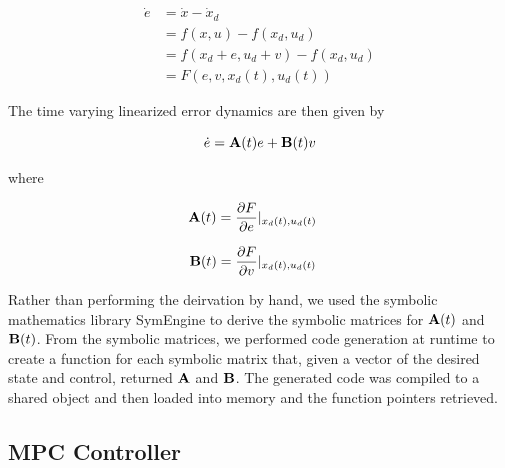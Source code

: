 \documentclass[conference]{IEEEtran}
\begin{document}
\begin{equation}
    \label{eq:nonlinear-error-dynamics}
    \begin{split}
        \dot{e} & = \dot{x} - \dot{x}_d \\
                & = f(x, u) - f(x_d, u_d) \\
                & = f(x_d + e, u_d + v) - f(x_d, u_d) \\
                & = F(e, v, x_d(t), u_d(t))
    \end{split}
\end{equation}

The time varying linearized error dynamics are then given by

\begin{equation}
    \label{eq:nonlinear-error-dynamics-lvi}
    \dot{e} = {\bf A}(t)e + {\bf B}(t)v
\end{equation}

where

\begin{equation}
    \label{eq:ltvA}
    \begin{aligned}
        {\bf A}(t) &= \frac{\partial F}{\partial e}|_{x_d(t),u_d(t)}
    \end{aligned}
\end{equation}

\begin{equation}
    \label{eq:ltvB}
    \begin{aligned}
        {\bf B}(t) &= \frac{\partial F}{\partial v}|_{x_d(t),u_d(t)}
    \end{aligned}
\end{equation}

Rather than performing the deirvation by hand, we used the symbolic mathematics
library SymEngine \cite{symengine_repo} to derive the symbolic matrices for
${\bf A}(t)$ and ${\bf B}(t)$. From the symbolic matrices, we performed code
generation at runtime to create a function for each symbolic matrix that, given
a vector of the desired state and control, returned ${\bf A}$ and ${\bf B}$.
The generated code was compiled to a shared object and then loaded into memory
and the function pointers retrieved.


\subsection{MPC Controller}
\end{document}
